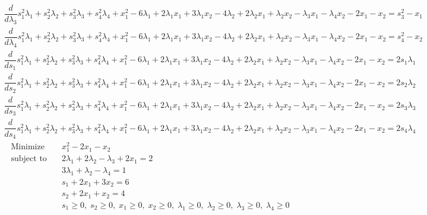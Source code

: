 \documentclass{article}
\begin{document}
\begin{align*}
\dfrac{d}{d\lambda_{3}}s_{1}^{2}\lambda_{1} + s_{2}^{2}\lambda_{2} + s_{3}^{2}\lambda_{3} + s_{4}^{2}\lambda_{4} + x_{1}^{2} - 6\lambda_{1} + 2\lambda_{1}x_{1} + 3\lambda_{1}x_{2} - 4\lambda_{2} + 2\lambda_{2}x_{1} + \lambda_{2}x_{2} - \lambda_{3}x_{1} - \lambda_{4}x_{2} - 2x_{1} - x_{2}=s_{3}^{2} - x_{1}\end{align*}
\begin{align*}
\dfrac{d}{d\lambda_{4}}s_{1}^{2}\lambda_{1} + s_{2}^{2}\lambda_{2} + s_{3}^{2}\lambda_{3} + s_{4}^{2}\lambda_{4} + x_{1}^{2} - 6\lambda_{1} + 2\lambda_{1}x_{1} + 3\lambda_{1}x_{2} - 4\lambda_{2} + 2\lambda_{2}x_{1} + \lambda_{2}x_{2} - \lambda_{3}x_{1} - \lambda_{4}x_{2} - 2x_{1} - x_{2}=s_{4}^{2} - x_{2}\end{align*}
\begin{align*}
\dfrac{d}{ds_{1}}s_{1}^{2}\lambda_{1} + s_{2}^{2}\lambda_{2} + s_{3}^{2}\lambda_{3} + s_{4}^{2}\lambda_{4} + x_{1}^{2} - 6\lambda_{1} + 2\lambda_{1}x_{1} + 3\lambda_{1}x_{2} - 4\lambda_{2} + 2\lambda_{2}x_{1} + \lambda_{2}x_{2} - \lambda_{3}x_{1} - \lambda_{4}x_{2} - 2x_{1} - x_{2}=2s_{1}\lambda_{1}\end{align*}
\begin{align*}
\dfrac{d}{ds_{2}}s_{1}^{2}\lambda_{1} + s_{2}^{2}\lambda_{2} + s_{3}^{2}\lambda_{3} + s_{4}^{2}\lambda_{4} + x_{1}^{2} - 6\lambda_{1} + 2\lambda_{1}x_{1} + 3\lambda_{1}x_{2} - 4\lambda_{2} + 2\lambda_{2}x_{1} + \lambda_{2}x_{2} - \lambda_{3}x_{1} - \lambda_{4}x_{2} - 2x_{1} - x_{2}=2s_{2}\lambda_{2}\end{align*}
\begin{align*}
\dfrac{d}{ds_{3}}s_{1}^{2}\lambda_{1} + s_{2}^{2}\lambda_{2} + s_{3}^{2}\lambda_{3} + s_{4}^{2}\lambda_{4} + x_{1}^{2} - 6\lambda_{1} + 2\lambda_{1}x_{1} + 3\lambda_{1}x_{2} - 4\lambda_{2} + 2\lambda_{2}x_{1} + \lambda_{2}x_{2} - \lambda_{3}x_{1} - \lambda_{4}x_{2} - 2x_{1} - x_{2}=2s_{3}\lambda_{3}\end{align*}
\begin{align*}
\dfrac{d}{ds_{4}}s_{1}^{2}\lambda_{1} + s_{2}^{2}\lambda_{2} + s_{3}^{2}\lambda_{3} + s_{4}^{2}\lambda_{4} + x_{1}^{2} - 6\lambda_{1} + 2\lambda_{1}x_{1} + 3\lambda_{1}x_{2} - 4\lambda_{2} + 2\lambda_{2}x_{1} + \lambda_{2}x_{2} - \lambda_{3}x_{1} - \lambda_{4}x_{2} - 2x_{1} - x_{2}=2s_{4}\lambda_{4}\end{align*}
\begin{align*}
\text{Minimize} \quad & x_{1}^{2} - 2x_{1} - x_{2}\\
\text{subject to} \quad
& 2\lambda_{1} + 2\lambda_{2} - \lambda_{3} + 2x_{1}=2\\
& 3\lambda_{1} + \lambda_{2} - \lambda_{4}=1\\
& s_{1} + 2x_{1} + 3x_{2}=6\\
& s_{2} + 2x_{1} + x_{2}=4\\
& s_{1}\ge0,\; s_{2}\ge0,\; x_{1}\ge0,\; x_{2}\ge0,\; \lambda_{1}\ge0,\; \lambda_{2}\ge0,\; \lambda_{3}\ge0,\; \lambda_{4}\ge0\end{align*}
\end{document}
